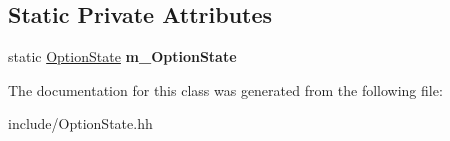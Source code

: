 \subsection*{Static Private Attributes}
\begin{DoxyCompactItemize}
\item 
\hypertarget{class_option_state_a37df5f358401b0a332d88a9d77d66590}{}static \hyperlink{class_option_state}{Option\+State} {\bfseries m\+\_\+\+Option\+State}\label{class_option_state_a37df5f358401b0a332d88a9d77d66590}

\end{DoxyCompactItemize}


The documentation for this class was generated from the following file\+:\begin{DoxyCompactItemize}
\item 
include/Option\+State.\+hh\end{DoxyCompactItemize}
